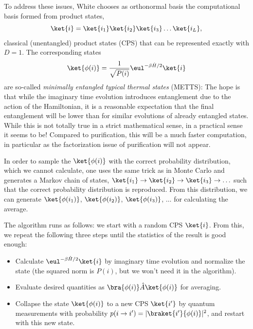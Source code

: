 To address these issues, White chooses as orthonormal basis the computational basis formed from product states,
\begin{equation}
\ket{i} = \ket{i_1}\ket{i_2}\ket{i_3} \ldots \ket{i_L} ,
\end{equation}
classical (unentangled) product states (CPS) that can be represented exactly with $D=1$. The corresponding states
\begin{equation}
\ket{\phi(i)} = \frac{1}{\sqrt{P(i)}} \eul^{-\beta \hat{H}/2} \ket{i}
\end{equation}
are so-called {\em minimally entangled typical thermal states} (METTS): The hope is that while the imaginary time evolution introduces entanglement due to the action of the Hamiltonian, it is a reasonable expectation that the final entanglement will be lower than for similar evolutions of already entangled states. While this is not totally true in a strict mathematical sense, in a practical sense it seems to be! Compared to purification, this will be a much faster computation, in particular as the factorization issue of purification will not appear.

In order to sample the $\ket{\phi(i)}$ with the correct probability distribution, which we cannot calculate, one uses the same trick as in Monte Carlo and generates a Markov chain of states,
$\ket{i_1} \rightarrow \ket{i_2} \rightarrow \ket{i_3} \rightarrow \ldots$ such that the correct probability distribution is reproduced. From this distribution, we can generate $\ket{\phi(i_1)}$, $\ket{\phi(i_2)}$, $\ket{\phi(i_3)}$, $\ldots$ for calculating the average.

The algorithm runs as follows: we start with a random CPS $\ket{i}$. From this, we repeat the following three steps until the statistics of the result is good enough:
\begin{itemize}  
\item Calculate $\eul^{-\beta\hat{H}/2} \ket{i}$ by imaginary time evolution and normalize the state (the squared norm is $P(i)$, but we won't need it in the algorithm). 
\item Evaluate desired quantities as $\bra{\phi(i)} \hat{A} \ket{\phi(i)}$ for averaging.
\item Collapse the state $\ket{\phi(i)}$ to a new CPS $\ket{i'}$ by quantum measurements with probability $p(i\rightarrow i') = |\braket{i'}{\phi(i)}|^2$, and restart with this new state.
\end{itemize}

